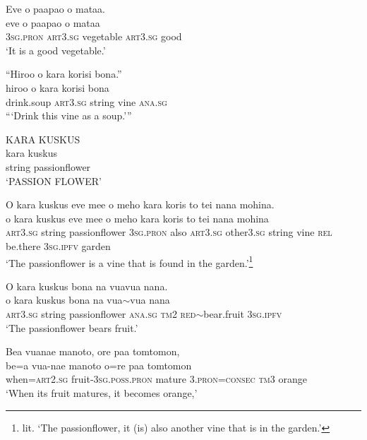 \ea\label{ex:text7-30}
Eve o paapao o mataa.\\
\gll eve	o	paapao	o	mataa\\
     3\textsc{sg}.\textsc{pron}	\textsc{art}3.\textsc{sg}	vegetable	\textsc{art}3.\textsc{sg}	good\\
\glt `It is a good vegetable.'
\z

\ea\label{ex:text7-31}
``Hiroo o kara korisi bona.''\\
\gll hiroo	o	kara	korisi	bona\\
     drink.soup	\textsc{art}3.\textsc{sg}	string	vine	\textsc{ana}.\textsc{sg}\\
\glt ```Drink this vine as a soup.'''
\z

\ea\label{ex:text7-32}
KARA KUSKUS\\
\gll kara	kuskus\\
     string	passionflower\\
\glt `PASSION FLOWER'
\z

\ea\label{ex:text7-33}
O kara kuskus eve mee o meho kara koris to tei nana mohina.\\
\gll o	kara	kuskus	eve	mee	o	meho	kara	koris	to	tei	nana	mohina\\
     \textsc{art}3.\textsc{sg}	string	passionflower	3\textsc{sg}.\textsc{pron}	also	\textsc{art}3.\textsc{sg}	other3.\textsc{sg}	string	vine	\textsc{rel}	be.there	3\textsc{sg}.\textsc{ipfv}	garden\\
\glt `The passionflower is a vine that is found in the garden.'\footnote{lit. `The passionflower, it (is) also another vine that is in the garden.'}
\z

\ea\label{ex:text7-34}
O kara kuskus bona na vuavua nana.\\
\gll o	kara	kuskus	bona	na	vua{$\sim$}vua	nana\\
     \textsc{art}3.\textsc{sg}	string	passionflower	\textsc{ana}.\textsc{sg}	\textsc{tm}2	\textsc{red}{$\sim$}bear.fruit	3\textsc{sg}.\textsc{ipfv}\\
\glt `The passionflower bears fruit.'
\z

\ea\label{ex:text7-35}
Bea vuanae manoto, ore paa tomtomon,\\
\gll be=a	vua-nae	manoto	o=re	paa	tomtomon\\
     when=\textsc{art}2.\textsc{sg}	fruit-3\textsc{sg}.\textsc{poss}.\textsc{pron}	mature	3.\textsc{pron}=\textsc{consec}	\textsc{tm}3	orange\\
\glt `When its fruit matures, it becomes orange,'
\z

